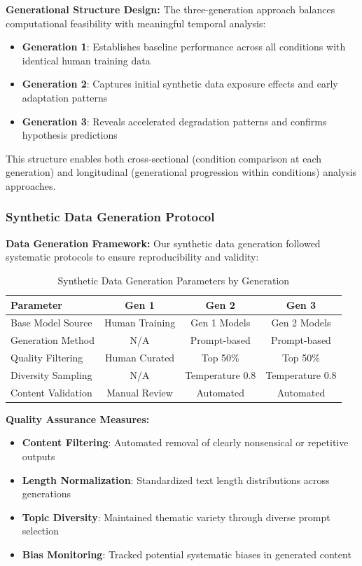 \documentclass{article}
\begin{document}
\textbf{Generational Structure Design:}
The three-generation approach balances computational feasibility with meaningful temporal analysis:
\begin{itemize}
    \item \textbf{Generation 1}: Establishes baseline performance across all conditions with identical human training data
    \item \textbf{Generation 2}: Captures initial synthetic data exposure effects and early adaptation patterns
    \item \textbf{Generation 3}: Reveals accelerated degradation patterns and confirms hypothesis predictions
\end{itemize}

This structure enables both cross-sectional (condition comparison at each generation) and longitudinal (generational progression within conditions) analysis approaches.

\subsubsection{Synthetic Data Generation Protocol}

\textbf{Data Generation Framework:}
Our synthetic data generation followed systematic protocols to ensure reproducibility and validity:

\begin{table}[H]
\centering
\caption{Synthetic Data Generation Parameters by Generation}
\label{tab:data_generation_params}
\begin{tabular}{lccc}
\toprule
\textbf{Parameter} & \textbf{Gen 1} & \textbf{Gen 2} & \textbf{Gen 3} \\
\midrule
Base Model Source & Human Training & Gen 1 Models & Gen 2 Models \\
Generation Method & N/A & Prompt-based & Prompt-based \\
Quality Filtering & Human Curated & Top 50\% & Top 50\% \\
Diversity Sampling & N/A & Temperature 0.8 & Temperature 0.8 \\
Content Validation & Manual Review & Automated & Automated \\
\bottomrule
\end{tabular}
\end{table}

\textbf{Quality Assurance Measures:}
\begin{itemize}
    \item \textbf{Content Filtering}: Automated removal of clearly nonsensical or repetitive outputs
    \item \textbf{Length Normalization}: Standardized text length distributions across generations
    \item \textbf{Topic Diversity}: Maintained thematic variety through diverse prompt selection
    \item \textbf{Bias Monitoring}: Tracked potential systematic biases in generated content
\end{itemize}
\end{document}
